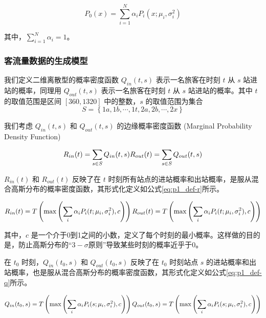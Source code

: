\documentclass[12pt,a4paper]{mcmthesis}
\begin{document}
    \begin{equation}
        P_0(x) = \sum_{i=1}^{N} \alpha_i P_i(x;\mu_i,\sigma^2_i)
        \label{eq:p1_def-gmm-continuous}
    \end{equation}

    其中，$\sum_{i=1}^{N} \alpha_i=1$。

    \subsubsection{客流量数据的生成模型}

    我们定义二维离散型的概率密度函数 $Q_{in}(t,s)$ 表示一名旅客在时刻 $t$ 从 $s$ 站进站的概率，同理用 $Q_{out}(t,s)$ 表示一名旅客在时刻 $t$ 从 $s$ 站进站的概率。其中 $t$ 的取值范围是区间 $[360,1320]$ 中的整数，$s$ 的取值范围为集合
    \[ S = \left\{ 1a,1b,\cdots,1t,2a,2b,\cdots,2x \right\} \]

    我们考虑 $Q_{in}(t,s)$ 和 $Q_{out}(t,s)$ 的边缘概率密度函数 (Marginal Probability Density Function)

    \begin{equation*}
        R_{in}(t) = \sum_{s \in S} Q_{in}(t,s) \\
        R_{out}(t) = \sum_{s \in S} Q_{out}(t,s)
    \end{equation*}

    $R_{in}(t)$ 和 $R_{out}(t)$ 反映了在 $t$ 时刻所有站点的进站概率和出站概率，是服从混合高斯分布的概率密度函数，其形式化定义如公式\ref{eq:p1_def-r}所示。

    \begin{equation}
        R_{in}(t) = T \left( \max \left( \sum_i \alpha_i P_i(t;\mu_i,\sigma^2_i), c \right) \right) \\
        R_{out}(t) = T \left( \max \left( \sum_i \alpha_i P_i(t;\mu_i,\sigma^2_i), c \right) \right)
        \label{eq:p1_def-r}
    \end{equation}

    其中，$c$ 是一个介于0到1之间的小数，定义了每个时刻的最小概率。这样做的目的是，防止高斯分布的“$3-\sigma$原则”导致某些时刻的概率近乎于0。

    在 $t_0$ 时刻，$Q_{in}(t_0,s)$ 和 $Q_{out}(t_0,s)$ 反映了在 $t_0$ 时刻站点 $s$ 的进站概率和出站概率，也是服从混合高斯分布的概率密度函数，其形式化定义如公式\ref{eq:p1_def-q}所示。

    \begin{equation}
        Q_{in}(t_0,s) = T \left( \max \left( \sum_i \alpha_i P_i(s;\mu_i,\sigma^2_i), c \right) \right) \\
        Q_{out}(t_0,s) = T \left( \max \left( \sum_i \alpha_i P_i(s;\mu_i,\sigma^2_i), c \right) \right)
        \label{eq:p1_def-q}
    \end{equation}
\end{document}
